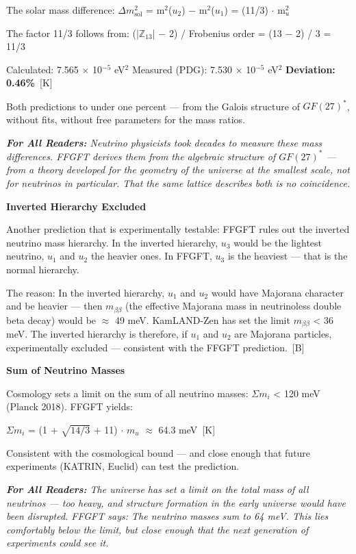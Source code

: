 \documentclass[11pt,oneside]{book}
\newcommand{\status}[1]{\penalty10000\,{\scriptsize\textcolor{gray!60}{[#1]}}}
\newenvironment{laierspur}{%
  \par\vspace{4pt}%
  \noindent\small\itshape\color{blue!60!black}%
  \textbf{For All Readers:}\enspace\ignorespaces}{%
  \par\vspace{4pt}\normalsize\normalfont\normalcolor}
\begin{document}
The solar mass difference:
$\Delta m^2_\text{sol}$ = m$^2$($
u_2$) $-$ m$^2$($
u_1$) = (11/3) $\cdot$ m$^2_
u$

The factor 11/3 follows from:
(|$\mathbb{Z}_{13}$| $-$ 2) / Frobenius order = (13 $-$ 2) / 3 = 11/3

Calculated: 7.565 $\times$ 10$^{-5}$ eV$^2$
Measured (PDG): 7.530 $\times$ 10$^{-5}$ eV$^2$
\textbf{Deviation: 0.46\%} \status{K}

Both predictions to under one percent — from the Galois structure of
$GF(27)^*$, without fits, without free parameters for the mass ratios.

\begin{laierspur}
Neutrino physicists took decades to measure these mass differences. FFGFT
derives them from the algebraic structure of $GF(27)^*$ — from a theory
developed for the geometry of the universe at the smallest scale, not for
neutrinos in particular. That the same lattice describes both is no
coincidence.
\end{laierspur}

\textbf{Inverted Hierarchy Excluded}

Another prediction that is experimentally testable: FFGFT rules out the
inverted neutrino mass hierarchy. In the inverted hierarchy, $
u_3$ would be
the lightest neutrino, $
u_1$ and $
u_2$ the heavier ones. In FFGFT, $
u_3$ is the
heaviest — that is the normal hierarchy.

The reason: In the inverted hierarchy, $
u_1$ and $
u_2$ would have Majorana
character and be heavier — then $m_{\beta\beta}$ (the effective Majorana mass in
neutrinoless double beta decay) would be $\approx$ 49 meV. KamLAND-Zen has set
the limit $m_{\beta\beta}$ < 36 meV. The inverted hierarchy is therefore, if $
u_1$
and $
u_2$ are Majorana particles, experimentally excluded — consistent with
the FFGFT prediction. \status{B}

\textbf{Sum of Neutrino Masses}

Cosmology sets a limit on the sum of all neutrino masses:
$\Sigma m_i$ < 120 meV (Planck 2018). FFGFT yields:

$\Sigma m_i$ = (1 + $\sqrt{14/3}$ + 11) $\cdot$ $m_
u$ $\approx$ 64.3 meV \status{K}

Consistent with the cosmological bound — and close enough that future
experiments (KATRIN, Euclid) can test the prediction.

\begin{laierspur}
The universe has set a limit on the total mass of all neutrinos — too
heavy, and structure formation in the early universe would have been
disrupted. FFGFT says: The neutrino masses sum to 64 meV. This lies
comfortably below the limit, but close enough that the next generation of
experiments could see it.
\end{laierspur}
\end{document}
